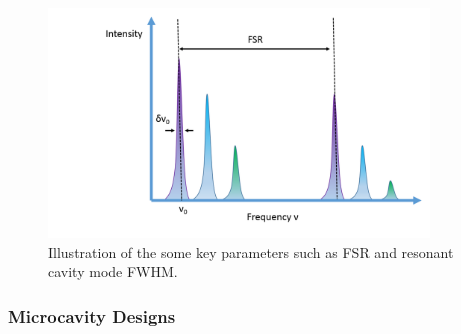 \begin{figure}[h]
	\centering
	\includegraphics[width=0.9\textwidth]{Figs/Ch1/modes.png}
	\caption {Illustration of the some key parameters such as FSR and resonant cavity mode FWHM. }
	\label{1.12}
\end{figure}
\FloatBarrier 

\subsubsection{Microcavity Designs}

